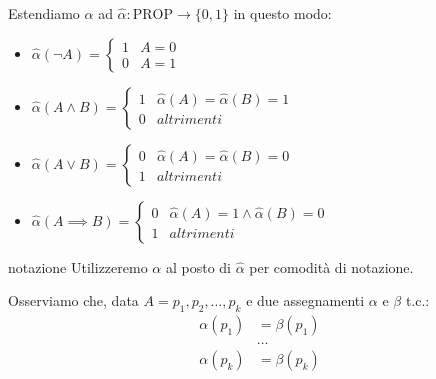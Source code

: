 \documentclass[a4paper,12pt]{report}
\begin{document}
    Estendiamo \( \alpha \) ad \( \hat{\alpha} : \text{PROP} \to \{0,1\} \) in questo modo:
            \vspace{0.5em}
    \begin{itemize}
        \item \( \hat{\alpha}(\neg A) = \begin{cases}
                1 &  A = 0 \\
                0 & A = 1
            \end{cases}\)

            \vspace{0.5em}

        \item \( \hat{\alpha}(A \land B) = \begin{cases}
                1 & \hat{\alpha}(A) = \hat{\alpha}(B)  = 1 \\
                0 & altrimenti
            \end{cases}\)

            \vspace{0.5em}

        \item \( \hat{\alpha}(A \lor B) = \begin{cases}
                0 & \hat{\alpha}(A) = \hat{\alpha}(B)  = 0 \\
                1 & altrimenti
            \end{cases}\)

            \vspace{0.5em}

        \item \( \hat{\alpha}(A \implies B) = \begin{cases}
                0 & \hat{\alpha}(A) = 1 \land \hat{\alpha}(B)  = 0 \\
                1 & altrimenti
        \end{cases}\)

\end{itemize}

\begin{gbox}{notazione}
    Utilizzeremo \( \alpha \) al posto di \( \hat{\alpha} \) per comodità di notazione.
\end{gbox}

Osserviamo che, data \( A = p_1, p_2, \dots, p_k \) e due assegnamenti \( \alpha \) e \( \beta \) t.c.:
        \begin{align*}
            \alpha(p_1) &= \beta(p_1) \\
            &\dots \\
            \alpha(p_k) &= \beta(p_k)
        \end{align*}
\end{document}
